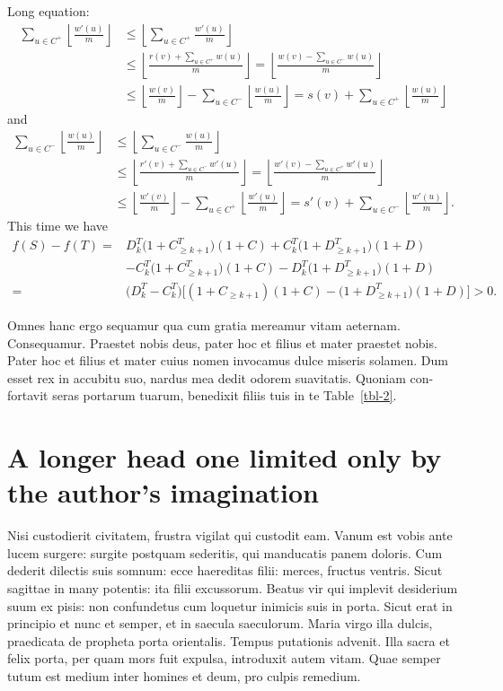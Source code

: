 \documentclass[numbers,compress]{vmsta}
\theoremstyle{definition}
\def\SM#1#2{\sum_{#1\in #2}}
\def\FL#1{\left\lfloor #1 \right\rfloor}
\def\FR#1#2{{\frac{#1}{#2}}}
\begin{document}
Long equation:
\begin{align}
\SM u{C^+}\FL{\FR{w'(u)}m} & \le \FL{\SM u{C^+} \FR{w'(u)}m}\nonumber\\
                           & \le \FL{\FR{r(v)+\SM u{C^+} w(u)}m} = \FL{\FR{w(v)-\SM u{C^-} w(u)}m}\nonumber \\
                           & \le \FL{\FR{w(v)}m}-\SM u{C^-}\FL{\FR{w(u)}m} = s(v)+\SM u{C^+}\FL{\FR{w(u)}m}
\end{align}
and
\begin{align}
\SM u{C^-}\FL{\FR{w(u)}m} & \le \FL{\SM u{C^-} \FR{w(u)}m}\nonumber\\
                          & \le \FL{\FR{r'(v)+\SM u{C^-} w'(u)}m} = \FL{\FR{w'(v)-\SM u{C^+} w'(u)}m}\nonumber \\
                          & \le \FL{\FR{w'(v)}m}-\SM u{C^+}\FL{\FR{w'(u)}m} = s'(v)+\SM u{C^-}\FL{\FR{w'(u)}m}.
\end{align}
This time we have
\begin{align}
f(S)-f(T) = {} & D_k^T\bigl(1+C_{\geq k+1}^T\bigr)(1 + C) + C_k^T\bigl(1+D_{\geq k+1}^T\bigr)(1 + D) \nonumber   \\
{}             & - C_k^T\bigl(1+C_{\geq k+1}^T\bigr)(1 + C) - D_k^T\bigl(1+D_{\geq k+1}^T\bigr)(1 + D) \nonumber \\
= {}           & \bigl(D_k^T-C_k^T\bigr)\bigl[(1+C_{\geq k+1})(1+C)-\bigl(1+D_{\geq k+1}^T\bigr)(1+D)\bigr]>0.
\end{align}

Omnes hanc ergo sequamur qua cum gratia mereamur vitam aeternam.
Consequamur. Praestet nobis deus, pater hoc et filius et mater
praestet nobis.  Pater hoc et filius et mater cuius nomen invocamus
dulce miseris solamen. Dum esset rex in accubitu suo, nardus mea
dedit odorem suavitatis. Quoniam con-fortavit seras portarum tuarum,
benedixit filiis tuis in te Table~\ref{tbl-2}.



\section{A longer head one limited only by the author's imagination}

Nisi custodierit civitatem, frustra vigilat qui custodit eam. Vanum
est vobis ante lucem surgere: surgite postquam sederitis, qui
manducatis panem doloris. Cum dederit dilectis suis somnum: ecce
haereditas filii: merces, fructus ventris. Sicut sagittae in many
potentis: ita filii excussorum. Beatus vir qui implevit desiderium
suum ex pisis: non confundetus cum loquetur inimicis suis in porta.
Sicut erat in principio et nunc et semper, et in saecula saeculorum.
Maria virgo illa dulcis, praedicata de propheta porta orientalis.
Tempus putationis advenit.  Illa sacra et felix porta, per quam mors
fuit expulsa, introduxit autem vitam.  Quae semper tutum est medium
inter homines et deum, pro culpis remedium.
\end{document}
